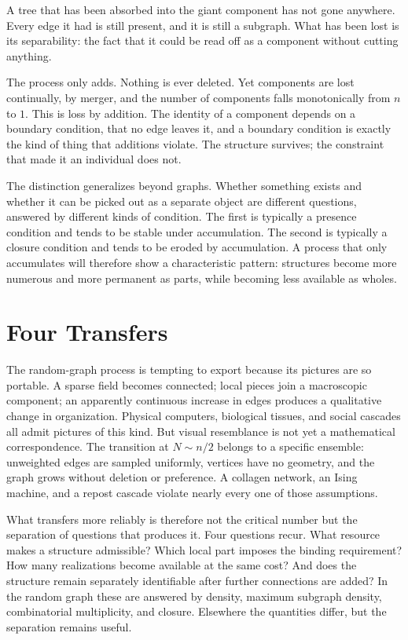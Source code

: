 \documentclass[11pt]{article}
\begin{document}
A tree that has been absorbed into the giant component has not gone anywhere. Every edge it had is still present, and it is still a subgraph. What has been lost is its separability: the fact that it could be read off as a component without cutting anything.

The process only adds. Nothing is ever deleted. Yet components are lost continually, by merger, and the number of components falls monotonically from $n$ to $1$. This is loss by addition. The identity of a component depends on a boundary condition, that no edge leaves it, and a boundary condition is exactly the kind of thing that additions violate. The structure survives; the constraint that made it an individual does not.

The distinction generalizes beyond graphs. Whether something exists and whether it can be picked out as a separate object are different questions, answered by different kinds of condition. The first is typically a presence condition and tends to be stable under accumulation. The second is typically a closure condition and tends to be eroded by accumulation. A process that only accumulates will therefore show a characteristic pattern: structures become more numerous and more permanent as parts, while becoming less available as wholes.

\section{Four Transfers}

The random-graph process is tempting to export because its pictures are so portable. A sparse field becomes connected; local pieces join a macroscopic component; an apparently continuous increase in edges produces a qualitative change in organization. Physical computers, biological tissues, and social cascades all admit pictures of this kind. But visual resemblance is not yet a mathematical correspondence. The transition at $N\sim n/2$ belongs to a specific ensemble: unweighted edges are sampled uniformly, vertices have no geometry, and the graph grows without deletion or preference. A collagen network, an Ising machine, and a repost cascade violate nearly every one of those assumptions.

What transfers more reliably is therefore not the critical number but the separation of questions that produces it. Four questions recur. What resource makes a structure admissible? Which local part imposes the binding requirement? How many realizations become available at the same cost? And does the structure remain separately identifiable after further connections are added? In the random graph these are answered by density, maximum subgraph density, combinatorial multiplicity, and closure. Elsewhere the quantities differ, but the separation remains useful.
\end{document}
